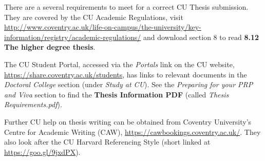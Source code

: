 There are a several requirements to meet for a correct CU Thesis submission. They are covered by the CU Academic Regulations, visit \url{http://www.coventry.ac.uk/life-on-campus/the-university/key-information/registry/academic-regulations/} and download section 8 to read \textbf{8.12 The higher degree thesis}. 

The CU Student Portal, accessed via the \emph{Portals} link on the CU website, \url{https://share.coventry.ac.uk/students}, has links to relevant documents in the \emph{Doctoral College} section (under \emph{Study at CU}). See the \emph{Preparing for your PRP and Viva} section to find the \textbf{Thesis Information PDF} (called \emph{Thesis Requirements.pdf}).

Further CU help on thesis writing can be obtained from Coventry University's Centre for Academic Writing (CAW), \url{https://cawbookings.coventry.ac.uk/}. They also look after the CU Harvard Referencing Style (short linked at \url{https://goo.gl/9jxdPX}).

